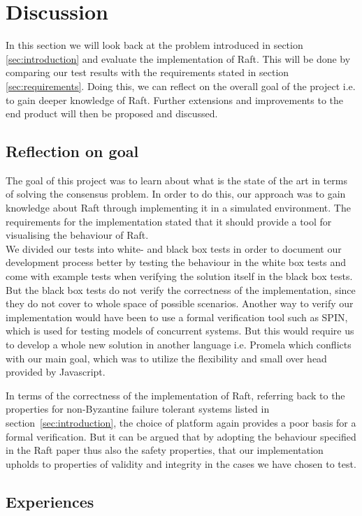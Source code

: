 \section{Discussion} %
\label{sec:discussion}
In this section we will look back at the problem introduced in section \ref{sec:introduction} and evaluate the implementation of Raft. This will be done by comparing our test results with the requirements stated in section \ref{sec:requirements}. Doing this, we can reflect on the overall goal of the project i.e. to gain deeper knowledge of Raft. Further extensions and improvements to the end product will then be proposed and discussed.

\subsection{Reflection on goal}
The goal of this project was to learn about what is the state of the art in terms of solving the consensus problem. In order to do this, our approach was to gain knowledge about Raft through implementing it in a simulated environment.
The requirements for the implementation stated that it should provide a tool for visualising the behaviour of Raft. \\
We divided our tests into white- and black box tests in order to document our development process better by testing the behaviour in the white box tests and come with example tests when verifying the solution itself in the black box tests. But the black box tests do not verify the correctness of the implementation, since they do not cover to whole space of possible scenarios. Another way to verify our implementation would have been to use a formal verification tool such as SPIN, which is used for testing models of concurrent systems. But this would require us to develop a whole new solution in another language i.e. Promela which conflicts with our main goal, which was to utilize the flexibility and small over head provided by Javascript.

In terms of the correctness of the implementation of Raft, referring back to the properties for non-Byzantine failure tolerant systems listed in section~\ref{sec:introduction}, the choice of platform again provides a poor basis for a formal verification. But it can be argued that by adopting the behaviour specified in the Raft paper thus also the safety properties, that our implementation upholds to properties of validity and integrity in the cases we have chosen to test.

\subsection{Experiences}

